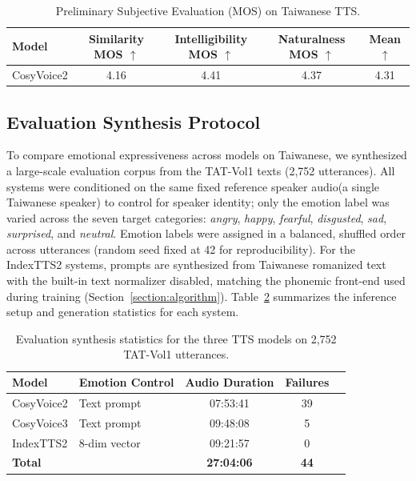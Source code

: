 \begin{table}[htbp]
\centering
\caption{Preliminary Subjective Evaluation (MOS) on Taiwanese TTS.}
\label{tab:taiwanese_mos}
\begin{tabular}{lcccc}
\toprule
\textbf{Model} & \textbf{Similarity MOS $\uparrow$} & \textbf{Intelligibility MOS $\uparrow$} & \textbf{Naturalness MOS $\uparrow$} & \textbf{Mean $\uparrow$} \\
\midrule
CosyVoice2 & 4.16 & 4.41 & 4.37 & 4.31 \\
\bottomrule
\end{tabular}
\end{table}

\subsection{Evaluation Synthesis Protocol}
\label{section:exp:synthesis}
To compare emotional expressiveness across models on Taiwanese, we synthesized a large-scale evaluation corpus from the TAT-Vol1 texts (2,752 utterances). All systems were conditioned on the same fixed reference speaker audio(a single Taiwanese speaker) to control for speaker identity; only the emotion label was varied across the seven target categories: \textit{angry}, \textit{happy}, \textit{fearful}, \textit{disgusted}, \textit{sad}, \textit{surprised}, and \textit{neutral}. Emotion labels were assigned in a balanced, shuffled order across utterances (random seed fixed at 42 for reproducibility). For the IndexTTS2 systems, prompts are synthesized from Taiwanese romanized text with the built-in text normalizer disabled, matching the phonemic front-end used during training (Section~\ref{section:algorithm}). Table~\ref{tab:synthesis_stats} summarizes the inference setup and generation statistics for each system.

\begin{table}[htbp]
\centering
\small
\caption{Evaluation synthesis statistics for the three TTS models on 2,752 TAT-Vol1 utterances.}
\label{tab:synthesis_stats}
\begin{tabular}{llccc}
\toprule
\textbf{Model} & \textbf{Emotion Control} & \textbf{Audio Duration} & \textbf{Failures} \\
\midrule
CosyVoice2   & Text prompt   & 07:53:41 & 39 \\
CosyVoice3   & Text prompt   & 09:48:08 & 5  \\
IndexTTS2    & 8-dim vector  & 09:21:57 & 0  \\
\midrule
\textbf{Total} & & \textbf{27:04:06} & \textbf{44} \\
\bottomrule
\end{tabular}
\end{table}

